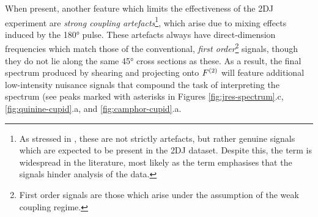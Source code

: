 When present, another feature which limits the effectiveness of the \ac{2DJ}
experiment are \emph{strong coupling artefacts}\footnote{
    As stressed in \cite{Thrippleton2005}, these are not strictly artefacts,
    but rather genuine signals which are expected to be present in the
    \ac{2DJ} dataset. Despite this, the term is widespread in the literature,
    most likely as the term emphasises that the signals hinder analysis of the data.
}, which arise due to mixing effects induced by the \ang{180}
pulse\cite{Wider1983,Thrippleton2005}.
These artefacts always have direct-dimension
frequencies which match those of the conventional, \emph{first order}\footnote{
    First order signals are those which arise under the assumption of the weak
    coupling regime\cite[Section 2.5.2]{Cavanagh2007}.
} signals, though they do not lie along the same \ang{45} cross sections as
these. As a result, the final spectrum produced by shearing and projecting onto
$F^{(2)}$ will feature additional low-intensity nuisance signals that
compound the task of interpreting the spectrum (see peaks marked with asterisks
in Figures \ref{fig:jres-spectrum}.c, \ref{fig:quinine-cupid}.a, and
\ref{fig:camphor-cupid}.a.


